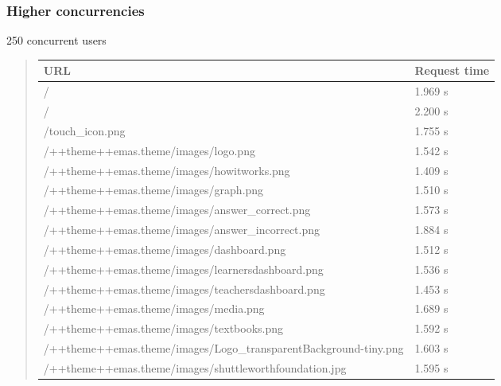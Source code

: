 \documentclass[letterpaper,10pt,english]{sphinxmanual}
\begin{document}
\subsubsection{Higher concurrencies}
\label{index:higher-concurrencies}
250 concurrent users
\begin{quote}

\begin{tabulary}{\linewidth}{|L|L|}
\hline
\textbf{\relax 
URL
} & \textbf{\relax 
Request time
}\\\hline

/
 & 
1.969 s
\\\hline

/
 & 
2.200 s
\\\hline

/touch\_icon.png
 & 
1.755 s
\\\hline

/++theme++emas.theme/images/logo.png
 & 
1.542 s
\\\hline

/++theme++emas.theme/images/howitworks.png
 & 
1.409 s
\\\hline

/++theme++emas.theme/images/graph.png
 & 
1.510 s
\\\hline

/++theme++emas.theme/images/answer\_correct.png
 & 
1.573 s
\\\hline

/++theme++emas.theme/images/answer\_incorrect.png
 & 
1.884 s
\\\hline

/++theme++emas.theme/images/dashboard.png
 & 
1.512 s
\\\hline

/++theme++emas.theme/images/learnersdashboard.png
 & 
1.536 s
\\\hline

/++theme++emas.theme/images/teachersdashboard.png
 & 
1.453 s
\\\hline

/++theme++emas.theme/images/media.png
 & 
1.689 s
\\\hline

/++theme++emas.theme/images/textbooks.png
 & 
1.592 s
\\\hline

/++theme++emas.theme/images/Logo\_transparentBackground-tiny.png
 & 
1.603 s
\\\hline

/++theme++emas.theme/images/shuttleworthfoundation.jpg
 & 
1.595 s
\\\hline


\end{tabulary}
\end{quote}
\end{document}
